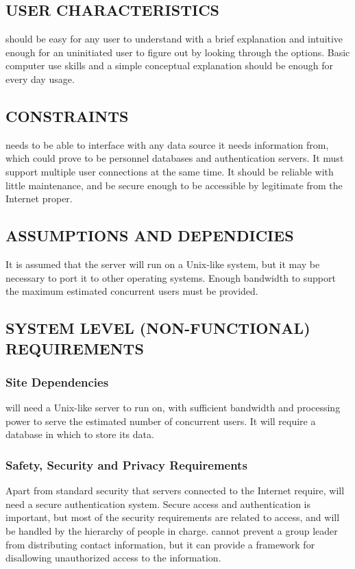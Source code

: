 \documentclass[12pt]{report}
\begin{document}
 \subsection{USER CHARACTERISTICS}
   should be easy for any user to understand with a brief explanation and intuitive enough for an uninitiated user to figure out by looking through the options. Basic computer use skills and a simple conceptual explanation should be enough for every day usage.
 \subsection{CONSTRAINTS}
   needs to be able to interface with any data source it needs information from, which could prove to be personnel databases and authentication servers. It must support multiple user connections at the same time. It should be reliable with little maintenance, and be secure enough to be accessible by legitimate from the Internet proper.
 \subsection{ASSUMPTIONS AND DEPENDICIES}
  It is assumed that the  server will run on a Unix-like system, but it may be necessary to port it to other operating systems. Enough bandwidth to support the maximum estimated concurrent users must be provided.
 \subsection{SYSTEM LEVEL (NON-FUNCTIONAL) REQUIREMENTS}
  \subsubsection{Site Dependencies}
    will need a Unix-like server to run on, with sufficient bandwidth and processing power to serve the estimated number of concurrent users. It will require a database in which to store its data.
  \subsubsection{Safety, Security and Privacy Requirements}
   Apart from standard security that servers connected to the Internet require,  will need a secure authentication system. Secure access and authentication is important, but most of the security requirements are related to access, and will be handled by the hierarchy of people in charge.  cannot prevent a group leader from distributing contact information, but it can provide a framework for disallowing unauthorized access to the information.
\end{document}

